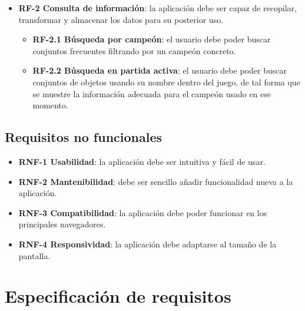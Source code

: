 \begin{itemize}
	\item \textbf{RF-2 Consulta de información}: la aplicación debe ser capaz de recopilar, transformar y almacenar los datos para su posterior uso.
	\begin{itemize}
		\item \textbf{RF-2.1 Búsqueda por campeón}: el usuario debe poder buscar conjuntos frecuentes filtrando por un campeón concreto.
		\item \textbf{RF-2.2 Búsqueda en partida activa}: el usuario debe poder buscar conjuntos de objetos usando su nombre dentro del juego, de tal forma que se muestre la información adecuada para el campeón usado en ese momento.
	\end{itemize}
\end{itemize}

\subsection{Requisitos no funcionales}
\begin{itemize}
	\item \textbf{RNF-1 Usabilidad}: la aplicación debe ser intuitiva y fácil de usar.
	\item \textbf{RNF-2 Mantenibilidad}: debe ser sencillo añadir funcionalidad nueva a la aplicación.
	\item \textbf{RNF-3 Compatibilidad}: la aplicación debe poder funcionar en	los principales navegadores.
	\item \textbf{RNF-4 Responsividad}: la aplicación debe adaptarse al tamaño	de la pantalla.
\end{itemize}

\section{Especificación de requisitos}


